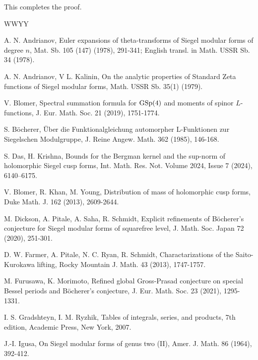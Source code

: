 \documentclass[11pt]{amsart}
\numberwithin{equation}{section}
\theoremstyle{plain}
\theoremstyle{definition}
\numberwithin{equation}{section}
\begin{document}
 This completes the proof. 
 

 
  
 \begin{thebibliography}{WWYY}
 
  A. N.  Andrianov, Euler expansions of theta-transforms of Siegel modular forms of degree $n$, Mat. Sb. 105 (147) (1978), 291-341; English transl. in Math. USSR Sb. 34 (1978).

  A. N.  Andrianov, V L. Kalinin, On the analytic properties of Standard Zeta functions of Siegel modular forms,
  Math. USSR Sb. 35(1) (1979).
 	
	
 V. Blomer,  Spectral summation formula for ${\rm GSp}(4)$ and moments of spinor $L$-functions,   J. Eur. Math. Soc. 21 (2019), 1751-1774.

  S. B\"ocherer, \"Uber die Funktionalgleichung automorpher L-Funktionen zur
Siegelschen Modulgruppe, J. Reine Angew. Math. 362 (1985), 146-168.

 S. Das, H. Krishna, Bounds for the Bergman kernel and the sup-norm of holomorphic Siegel cusp forms, Int. Math. Res. Not. Volume 2024, Issue 7  (2024),  6140–6175. 

  V. Blomer, R. Khan, M. Young,  Distribution of mass of holomorphic cusp forms,   Duke Math. J. 162 (2013), 2609-2644.

 M. Dickson, A. Pitale, A. Saha, R. Schmidt, Explicit refinements of B\"ocherer's conjecture for Siegel modular
forms of squarefree level, J. Math. Soc. Japan 72 (2020),  251-301.

 D. W. Farmer, A. Pitale, N. C. Ryan, R. Schmidt, Charactarizations of the Saito-Kurokawa lifting, Rocky Mountain J. Math. 43 (2013), 1747-1757.

 M. Furusawa, K. Morimoto, Refined global Gross-Prasad conjecture on special Bessel periods and B\"ocherer's
conjecture, J. Eur. Math. Soc.   23 (2021),  1295-1331.

 I. S. Gradshteyn, I. M. Ryzhik,  Tables of integrals, series, and products, 7th edition, Academic Press, New
York, 2007.

 J.-I. Igusa, On Siegel modular forms of genus two (II), Amer. J. Math.  86 (1964),  392-412.


\end{thebibliography}
\end{document}

